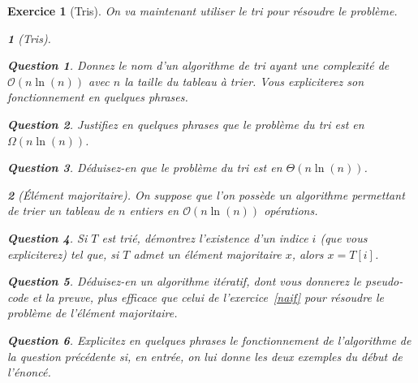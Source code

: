 \documentclass{article}
\theoremstyle{exostyle}
\newtheorem{exo}{Exercice}
\theoremstyle{partiestyle}
\newtheorem{partie}{}[exo]
\theoremstyle{questionstyle}
\newtheorem{questionpartie}{Question}[partie]
\begin{document}
\clearpage
\begin{exo}[Tris]
    On va maintenant utiliser le tri pour résoudre le problème.
    
    \begin{partie}[Tris]
        \begin{questionpartie}
            Donnez le nom d'un algorithme de tri ayant une complexité de $\mathcal{O}(n\ln(n))$ avec $n$ la taille du tableau à trier. Vous expliciterez son fonctionnement en quelques phrases.
        \end{questionpartie}

        \begin{questionpartie}
            Justifiez en quelques phrases que le problème du tri est en $\Omega(n\ln(n))$.
        \end{questionpartie}

        \begin{questionpartie}
            Déduisez-en que le problème du tri est en $\Theta(n\ln(n))$.
        \end{questionpartie}
        \end{partie}
    
        \begin{partie}[Élément  majoritaire]
            On suppose que l'on possède un algorithme permettant de trier un tableau de $n$ entiers en $\mathcal{O}(n \ln(n))$ opérations.
            \begin{questionpartie}
                Si $T$ est trié, démontrez l'existence d'un indice $i$ (que vous expliciterez) tel que, si $T$ admet un élément majoritaire $x$, alors $x=T[i]$. 
            \end{questionpartie}
            \begin{questionpartie}
                Déduisez-en un algorithme itératif, dont vous donnerez le pseudo-code et la preuve, plus efficace que celui de l'exercice~\ref{naif} pour résoudre le problème de l'élément majoritaire.            
            \end{questionpartie}
            \begin{questionpartie}
                Explicitez en quelques phrases le fonctionnement de l'algorithme de la question précédente si, en entrée, on lui donne les deux exemples du début de l'énoncé.
            \end{questionpartie}            
        \end{partie}   
    \end{exo}
\end{document}
